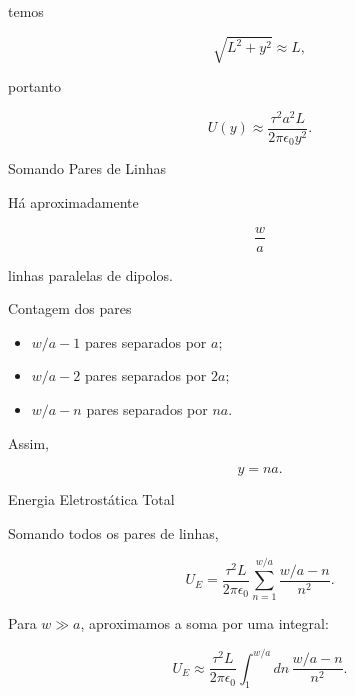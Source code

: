 \documentclass[aspectratio=169]{beamer}
\begin{document}
\begin{frame}

temos

\begin{equation}
\sqrt{L^2+y^2}\approx L,
\end{equation}

portanto

\begin{eqbox}
\begin{equation}
U(y)
\approx
\frac{\tau^2a^2L}{2\pi\epsilon_0y^2}.
\end{equation}
\end{eqbox}

\end{frame}

\begin{frame}{Somando Pares de Linhas}

Há aproximadamente

\[
\frac{w}{a}
\]

linhas paralelas de dipolos.

\begin{mybox}{Contagem dos pares}
\begin{itemize}
\item \(w/a-1\) pares separados por \(a\);
\item \(w/a-2\) pares separados por \(2a\);
\item \(w/a-n\) pares separados por \(na\).
\end{itemize}
\end{mybox}

Assim,

\[
y=na.
\]

\end{frame}

\begin{frame}{Energia Eletrostática Total}

Somando todos os pares de linhas,

\begin{eqbox}
\begin{equation}
U_E
=
\frac{\tau^2L}{2\pi\epsilon_0}
\sum_{n=1}^{w/a}
\frac{w/a-n}{n^2}.
\tag{4.49a}
\label{eq:4.49a}
\end{equation}
\end{eqbox}

Para \(w\gg a\), aproximamos a soma por uma integral:

\begin{eqbox}
\begin{equation}
U_E
\approx
\frac{\tau^2L}{2\pi\epsilon_0}
\int_1^{w/a}
dn\,
\frac{w/a-n}{n^2}.
\tag{4.49b}
\label{eq:4.49b}
\end{equation}
\end{eqbox}

\end{frame}
\end{document}
